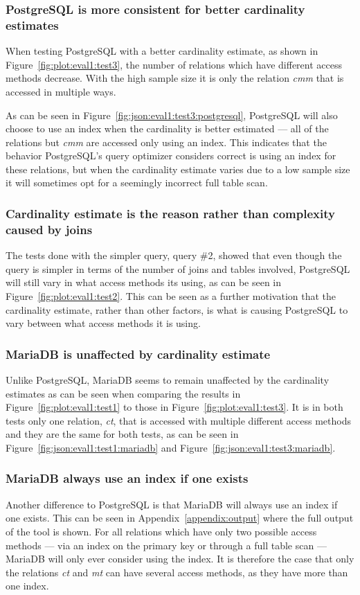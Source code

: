 \subsubsection{PostgreSQL is more consistent for better cardinality estimates}
When testing PostgreSQL with a better cardinality estimate, as shown in
Figure~\ref{fig:plot:eval1:test3}, the number of relations which have different
access methods decrease. With the high sample size it is only the relation
\textit{cmm} that is accessed in multiple ways.

As can be seen in Figure~\ref{fig:json:eval1:test3:postgresql}, PostgreSQL will
also choose to use an index when the cardinality is better estimated --- all of
the relations but \textit{cmm} are accessed only using an index. This indicates
that the behavior PostgreSQL's query optimizer considers correct is using an
index for these relations, but when the cardinality estimate varies due to a low
sample size it will sometimes opt for a seemingly incorrect full table scan.

\subsubsection{Cardinality estimate is the reason rather than complexity caused
  by joins}
The tests done with the simpler query, query \#2, showed that even though the
query is simpler in terms of the number of joins and tables involved, PostgreSQL
will still vary in what access methods its using, as can be seen in
Figure~\ref{fig:plot:eval1:test2}. This can be seen as a further motivation that
the cardinality estimate, rather than other factors, is what is causing
PostgreSQL to vary between what access methods it is using.

\subsubsection{MariaDB is unaffected by cardinality estimate}
Unlike PostgreSQL, MariaDB seems to remain unaffected by the cardinality
estimates as can be seen when comparing the results in
Figure~\ref{fig:plot:eval1:test1} to those in Figure~\ref{fig:plot:eval1:test3}.
It is in both tests only one relation, \textit{ct}, that is accessed with
multiple different access methods and they are the same for both tests, as can
be seen in Figure~\ref{fig:json:eval1:test1:mariadb} and
Figure~\ref{fig:json:eval1:test3:mariadb}.

\subsubsection{MariaDB always use an index if one exists}
Another difference to PostgreSQL is that MariaDB will always use an index if one
exists. This can be seen in Appendix~\ref{appendix:output} where the full output
of the tool is shown. For all relations which have only two possible access
methods --- via an index on the primary key or through a full table scan ---
MariaDB will only ever consider using the index. It is therefore the case
that only the relations \textit{ct} and \textit{mt} can have several access
methods, as they have more than one index.

